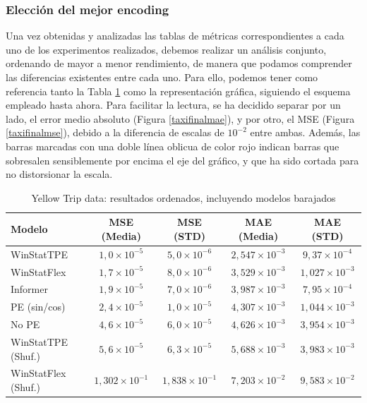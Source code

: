 \subsubsection{Elección del mejor encoding}

Una vez obtenidas y analizadas las tablas de métricas correspondientes a cada uno de los experimentos realizados, debemos realizar un análisis conjunto, ordenando de mayor a menor rendimiento, de manera que podamos comprender las diferencias existentes entre cada uno. Para ello, podemos tener como referencia tanto la Tabla \ref{taxifinal} como la representación gráfica, siguiendo el esquema empleado hasta ahora. Para facilitar la lectura, se ha decidido separar por un lado, el error medio absoluto (Figura \ref{taxifinalmae}), y por otro, el MSE (Figura \ref{taxifinalmse}), debido a la diferencia de escalas de $10^{-2}$ entre ambas. Además, las barras marcadas con una doble línea oblicua de color rojo indican barras que sobresalen sensiblemente por encima el eje del gráfico, y que ha sido cortada para no distorsionar la escala.\\


\begin{table}[!ht]
	\centering
	\begin{tabular}{l|cc|cc}
		\toprule
		Modelo & MSE (Media) & MSE (STD) & MAE (Media) & MAE (STD) \\
		\midrule
		WinStatTPE & $1,0 \times 10^{-5}$ & $5,0 \times 10^{-6}$ & $2,547 \times 10^{-3}$ & $9,37 \times 10^{-4}$ \\
		WinStatFlex & $1,7 \times 10^{-5}$ & $8,0 \times 10^{-6}$ & $3,529 \times 10^{-3}$ & $1,027 \times 10^{-3}$ \\
		Informer & $1,9 \times 10^{-5}$ & $7,0 \times 10^{-6}$ & $3,987 \times 10^{-3}$ & $7,95 \times 10^{-4}$ \\
		PE (sin/cos) & $2,4 \times 10^{-5}$ & $1,0 \times 10^{-5}$ & $4,307 \times 10^{-3}$ & $1,044 \times 10^{-3}$ \\
		No PE & $4,6 \times 10^{-5}$ & $6,0 \times 10^{-5}$ & $4,626 \times 10^{-3}$ & $3,954 \times 10^{-3}$ \\
		WinStatTPE (Shuf.) & $5,6 \times 10^{-5}$ & $6,3 \times 10^{-5}$ & $5,688 \times 10^{-3}$ & $3,983 \times 10^{-3}$ \\
		WinStatFlex (Shuf.) & $1,302 \times 10^{-1}$ & $1,838 \times 10^{-1}$ & $7,203 \times 10^{-2}$ & $9,583 \times 10^{-2}$ \\
		\bottomrule
	\end{tabular}
	\caption{Yellow Trip data: resultados ordenados, incluyendo modelos barajados}
	\label{taxifinal}
\end{table}


